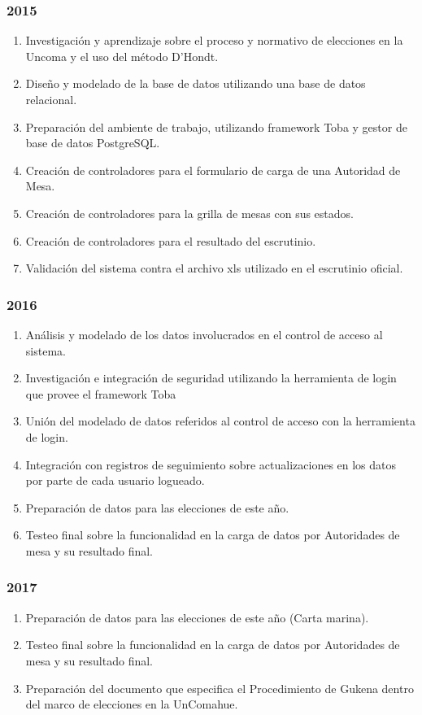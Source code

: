 \subsubsection{2015}

\begin{enumerate}
    
    \item Investigación y aprendizaje sobre el proceso y normativo de elecciones en la Uncoma y el uso del método D'Hondt.
    \item Diseño y modelado de la base de datos utilizando una base de datos relacional.
    \item Preparación del ambiente de trabajo, utilizando framework Toba y gestor de base de datos PostgreSQL.
    \item Creación de controladores para el formulario de carga de una Autoridad de Mesa.
    \item Creación de controladores para la grilla de mesas con sus estados.
    \item Creación de controladores para el resultado del escrutinio.
    \item Validación del sistema contra el archivo xls utilizado en el escrutinio oficial.
\end{enumerate}
\subsubsection{2016}
\begin{enumerate}
    \item Análisis y modelado de los datos involucrados en el control de acceso al sistema.
    \item Investigación e integración de seguridad utilizando la herramienta de login que provee el framework Toba
    \item Unión del modelado de datos referidos al control de acceso con la herramienta de login.
    \item Integración con registros de seguimiento sobre actualizaciones en los datos por parte de cada usuario logueado.
    \item Preparación de datos para las elecciones de este año.
    \item Testeo final sobre la funcionalidad en la carga de datos por Autoridades de mesa y su resultado final.
\end{enumerate}
\subsubsection{2017}
\begin{enumerate}
    \item Preparación de datos para las elecciones de este año (Carta marina).
    \item Testeo final sobre la funcionalidad en la carga de datos por Autoridades de mesa y su resultado final.
    \item Preparación del documento que especifica el Procedimiento de Gukena dentro del marco de elecciones en la UnComahue.
\end{enumerate}
